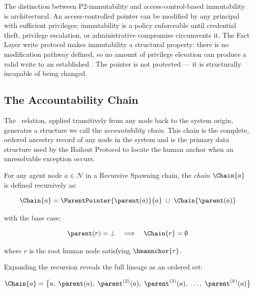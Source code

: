 The distinction between P2-immutability and access-control-based immutability is architectural. An access-controlled pointer can be modified by any principal with sufficient privileges; immutability is a policy enforceable until credential theft, privilege escalation, or administrative compromise circumvents it. The Fact Layer write protocol makes immutability a structural property: there is no modification pathway defined, so no amount of privilege elevation can produce a valid write to an established \ParentPointer. The pointer is not protected --- it is structurally incapable of being changed.

\subsection{The Accountability Chain}

The \ParentPointer\ relation, applied transitively from any node back to the system origin, generates a structure we call the \textit{accountability chain}. This chain is the complete, ordered ancestry record of any node in the system and is the primary data structure used by the Bailout Protocol to locate the human anchor when an unresolvable exception occurs.

\begin{dfn}
\label{def:chain}
For any agent node $a \in \mathcal{N}$ in a Recursive Spawning chain, the \emph{chain} $\Chain{a}$ is defined recursively as:

\begin{equation}
\Chain{a} = \ParentPointer{\parent(a)}{a} \;\cup\; \Chain{\parent(a)}
\label{eq:chain-recursive}
\end{equation}

\noindent with the base case:

\begin{equation}
\parent(r) = \bot \quad\Longrightarrow\quad \Chain{r} = \emptyset
\label{eq:chain-base}
\end{equation}

\noindent where $r$ is the root human node satisfying $\hmannchor{r}$.
\end{dfn}

Expanding the recursion reveals the full lineage as an ordered set:

\begin{equation}
\Chain{a} = \bigl\{ a,\; \parent(a),\; \parent^{(2)}(a),\; \parent^{(3)}(a),\; \ldots,\; \parent^{(k)}(a) \bigr\}
\label{eq:chain-expanded}
\end{equation}

